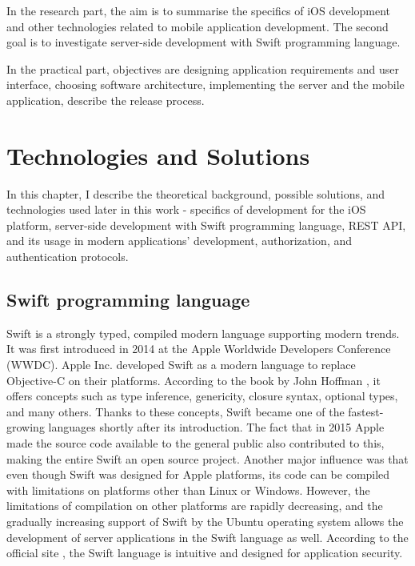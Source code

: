 \documentclass[
  biblatex = false,
  language=english,
  figures=false,
  sourcecodes,
  glossaries,
  index
]{kidiplom}
\begin{document}
In the research part, the aim is to summarise the specifics of iOS development and other technologies related to mobile application development. The second goal is to investigate server-side development with Swift programming language.

In the practical part, objectives are designing application requirements and user interface, choosing software architecture, implementing the server and the mobile application, describe the release process.

\section{Technologies and Solutions}

In this chapter, I describe the theoretical background, possible solutions, and technologies used later in this work - specifics of development for the iOS platform, server-side development with Swift programming language, REST API, and its usage in modern applications' development, authorization, and authentication protocols.

\subsection{Swift programming language}
Swift is a strongly typed, compiled modern language supporting modern trends. It was first introduced in 2014 at the Apple Worldwide Developers Conference (WWDC). Apple Inc. developed Swift as a modern language to replace Objective-C on their platforms. According to the book by John Hoffman \cite{bib2}, it offers concepts such as type inference, genericity, closure syntax, optional types, and many others. Thanks to these concepts, Swift became one of the fastest-growing languages shortly after its introduction. The fact that in 2015 Apple made the source code available to the general public also contributed to this, making the entire Swift an open source project. Another major influence was that even though Swift was designed for Apple platforms, its code can be compiled with limitations on platforms other than Linux or Windows. However, the limitations of compilation on other platforms are rapidly decreasing, and the gradually increasing support of Swift by the Ubuntu operating system allows the development of server applications in the Swift language as well. According to the official site \cite{bib3}, the Swift language is intuitive and designed for application security.
\end{document}

